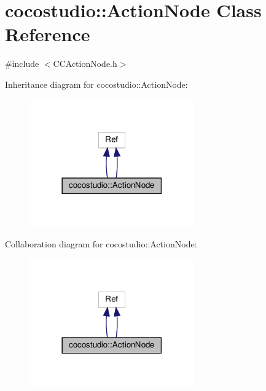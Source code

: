 \hypertarget{classcocostudio_1_1ActionNode}{}\section{cocostudio\+:\+:Action\+Node Class Reference}
\label{classcocostudio_1_1ActionNode}


{\ttfamily \#include $<$C\+C\+Action\+Node.\+h$>$}



Inheritance diagram for cocostudio\+:\+:Action\+Node\+:
\nopagebreak
\begin{figure}[H]
\begin{center}
\leavevmode
\includegraphics[width=201pt]{classcocostudio_1_1ActionNode__inherit__graph}
\end{center}
\end{figure}


Collaboration diagram for cocostudio\+:\+:Action\+Node\+:
\nopagebreak
\begin{figure}[H]
\begin{center}
\leavevmode
\includegraphics[width=201pt]{classcocostudio_1_1ActionNode__coll__graph}
\end{center}
\end{figure}
